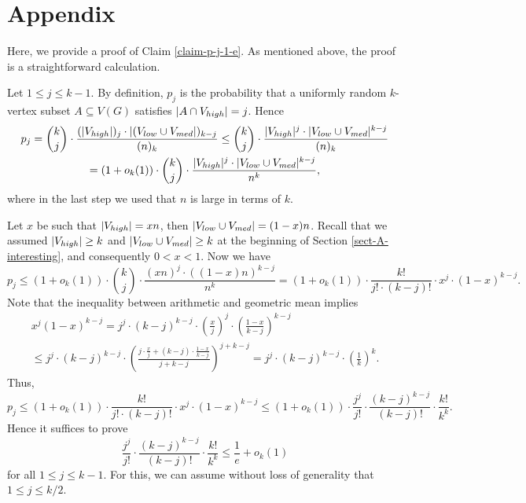 \documentclass[11pt]{article}
\theoremstyle{definition}
\numberwithin{equation}{section}
\begin{document}
\appendix %
\section*{Appendix}

Here, we provide a proof of Claim \ref{claim-p-j-1-e}. As mentioned above, the proof is a straightforward calculation.

Let $1\leq j\leq k-1$. By definition, $p_j$ is the probability that a uniformly random $k$-vertex subset $A\subseteq V(G)$ satisfies $\vert A\cap V_{\textnormal{high}}\vert =j$. Hence
\begin{multline*}
p_j={k\choose j}\cdot \frac{(\vert V_{\textnormal{high}}\vert)_j\cdot \vert (V_{\textnormal{low}}\cup V_{\textnormal{med}}\vert)_{k-j}}{(n)_k}\leq {k\choose j}\cdot \frac{\vert V_{\textnormal{high}}\vert^j\cdot \vert V_{\textnormal{low}}\cup V_{\textnormal{med}}\vert^{k-j}}{(n)_k}\\
=(1+o_k(1))\cdot {k\choose j}\cdot \frac{\vert V_{\textnormal{high}}\vert^j\cdot \vert V_{\textnormal{low}}\cup V_{\textnormal{med}}\vert^{k-j}}{n^k},
\end{multline*}
where in the last step we used that $n$ is large in terms of $k$.

Let $x$ be such that $\vert V_{\textnormal{high}}\vert=xn$, then $\vert V_{\textnormal{low}}\cup V_{\textnormal{med}}\vert=(1-x)n$. Recall that we assumed $\vert V_{\textnormal{high}}\vert\geq k$ and $\vert V_{\textnormal{low}}\cup V_{\textnormal{med}}\vert\geq k$ at the beginning of Section \ref{sect-A-interesting}, and consequently $0<x<1$. Now we have
\[p_j\leq (1+o_k(1))\cdot {k\choose j}\cdot \frac{(xn)^j\cdot ((1-x)n)^{k-j}}{n^k}=(1+o_k(1))\cdot \frac{k!}{j!\cdot (k-j)!}\cdot x^{j}\cdot (1-x)^{k-j}.\]
Note that the inequality between arithmetic and geometric mean implies
\begin{multline*}
x^j(1-x)^{k-j}=j^j\cdot (k-j)^{k-j}\cdot\left(\frac{x}{j}\right)^j\cdot\left(\frac{1-x}{k-j}\right)^{k-j}\\
\leq j^j\cdot (k-j)^{k-j}\cdot\left(\frac{j\cdot \frac{x}{j}+(k-j)\cdot \frac{1-x}{k-j}}{j+k-j}\right)^{j+k-j}=j^j\cdot (k-j)^{k-j}\cdot\left(\frac{1}{k}\right)^{k}.
\end{multline*}
Thus,
\[p_j\leq (1+o_k(1))\cdot \frac{k!}{j!\cdot (k-j)!}\cdot x^{j}\cdot (1-x)^{k-j}\leq (1+o_k(1))\cdot \frac{j^j}{j!}\cdot \frac{(k-j)^{k-j}}{(k-j)!}\cdot \frac{k!}{k^k}.\]
Hence it suffices to prove
\[\frac{j^j}{j!}\cdot\frac{(k-j)^{k-j}}{(k-j)!}\cdot \frac{k!}{k^k}\leq \frac{1}{e}+o_k(1)\]
for all $1\leq j\leq k-1$. For this, we can assume without loss of generality that $1\leq j\leq k/2$.
\end{document}
